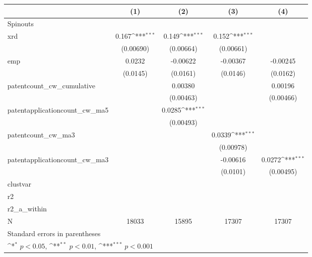 {
\def\sym#1{\ifmmode^{#1}\else\(^{#1}\)\fi}
\begin{tabular}{l*{4}{c}}
\hline\hline
            &\multicolumn{1}{c}{(1)}         &\multicolumn{1}{c}{(2)}         &\multicolumn{1}{c}{(3)}         &\multicolumn{1}{c}{(4)}         \\
\hline
Spinouts    &                     &                     &                     &                     \\
xrd         &       0.167\sym{***}&       0.149\sym{***}&       0.152\sym{***}&                     \\
            &   (0.00690)         &   (0.00664)         &   (0.00661)         &                     \\
[1em]
emp         &      0.0232         &    -0.00622         &    -0.00367         &    -0.00245         \\
            &    (0.0145)         &    (0.0161)         &    (0.0146)         &    (0.0162)         \\
[1em]
patentcount\_cw\_cumulative&                     &     0.00380         &                     &     0.00196         \\
            &                     &   (0.00463)         &                     &   (0.00466)         \\
[1em]
patentapplicationcount\_cw\_ma5&                     &      0.0285\sym{***}&                     &                     \\
            &                     &   (0.00493)         &                     &                     \\
[1em]
patentcount\_cw\_ma3&                     &                     &      0.0339\sym{***}&                     \\
            &                     &                     &   (0.00978)         &                     \\
[1em]
patentapplicationcount\_cw\_ma3&                     &                     &    -0.00616         &      0.0272\sym{***}\\
            &                     &                     &    (0.0101)         &   (0.00495)         \\
\hline
clustvar    &                     &                     &                     &                     \\
r2          &                     &                     &                     &                     \\
r2\_a\_within &                     &                     &                     &                     \\
N           &       18033         &       15895         &       17307         &       17307         \\
\hline\hline
\multicolumn{5}{l}{\footnotesize Standard errors in parentheses}\\
\multicolumn{5}{l}{\footnotesize \sym{*} \(p<0.05\), \sym{**} \(p<0.01\), \sym{***} \(p<0.001\)}\\
\end{tabular}
}
